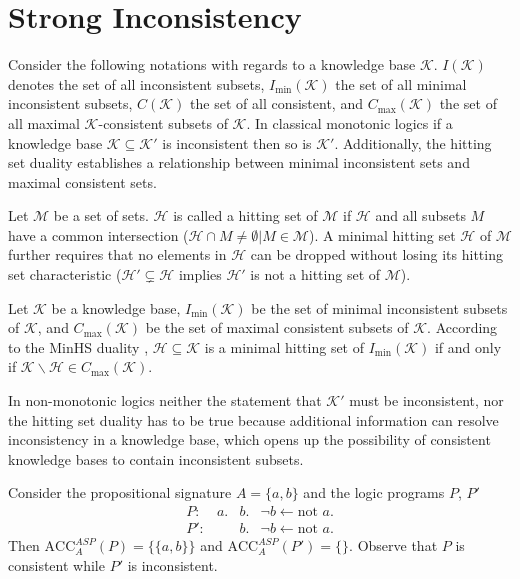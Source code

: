 \section{Strong Inconsistency}
Consider the following notations with regards to a knowledge base \(\mathcal{K}\). \(I(\mathcal{K})\) denotes the set of all inconsistent subsets, \(I_{\min}(\mathcal{K})\) the set of all minimal inconsistent subsets, \(C(\mathcal{K})\) the set of all consistent, and \(C_{\max}(\mathcal{K})\) the set of all maximal \(\mathcal{K}\)-consistent subsets of \(\mathcal{K}\). In classical monotonic logics if a knowledge base \(\mathcal{K} \subseteq \mathcal{K}'\) is inconsistent then so is \(\mathcal{K}'\). Additionally, the hitting set duality establishes a relationship between minimal inconsistent sets and maximal consistent sets.

Let \(\mathcal{M}\) be a set of sets. \(\mathcal{H}\) is called a hitting set of \(\mathcal{M}\) if \(\mathcal{H}\) and all subsets \(M\) have a common intersection (\(\mathcal{H} \cap M \neq \emptyset | M \in \mathcal{M}\)). A minimal hitting set \(\mathcal{H}\) of \(\mathcal{M}\) further requires that no elements in \(\mathcal{H}\) can be dropped without losing its hitting set characteristic (\(\mathcal{H}' \subsetneq \mathcal{H}\) implies \(\mathcal{H}'\) is not a hitting set of \(\mathcal{M}\)).

\begin{theorem}
    Let \(\mathcal{K}\) be a knowledge base, \(I_{\min}(\mathcal{K})\) be the set of minimal inconsistent subsets of \(\mathcal{K}\), and \(C_{\max}(\mathcal{K})\) be the set of maximal consistent subsets of \(\mathcal{K}\). According to the MinHS duality \cite{reiter_theory_1987}, \(\mathcal{H} \subseteq \mathcal{K}\) is a minimal hitting set of \(I_{\min}(\mathcal{K})\) if and only if \(\mathcal{K} \backslash \mathcal{H} \in C_{\max}(\mathcal{K})\).
\end{theorem}

In non-monotonic logics neither the statement that \(\mathcal{K}'\) must be inconsistent, nor the hitting set duality has to be true because additional information can resolve inconsistency in a knowledge base, which opens up the possibility of consistent knowledge bases to contain inconsistent subsets.

\begin{example}
    Consider the propositional signature \(A = \{a, b\}\) and the logic programs \(P\), \(P'\)
    \[\begin{array}{rrrr}
            P:  & a. & b. & \neg b \leftarrow \text{not }a. \\
            P': &    & b. & \neg b \leftarrow \text{not }a.
        \end{array}\]
    Then \(\text{ACC}_A^{ASP}(P) = \{\{a,b\}\}\) and \(\text{ACC}_A^{ASP}(P') = \{\}\). Observe that \(P\) is consistent while \(P'\) is inconsistent.
\end{example}

